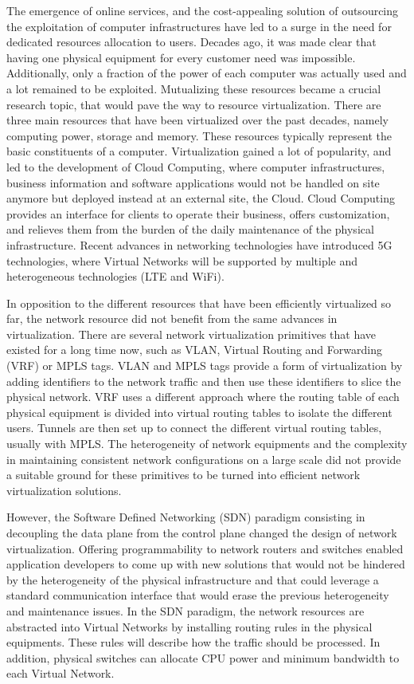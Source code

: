 \label{sec:thesis_introduction}
The emergence of online services, and the cost-appealing solution of outsourcing the exploitation of computer infrastructures have led to a surge in the need for dedicated resources allocation to users. Decades ago, it was made clear that having one physical equipment for every customer need was impossible. Additionally, only a fraction of the power of each computer was actually used and a lot remained to be exploited.
Mutualizing these resources became a crucial research topic, that would pave the way to resource virtualization. 
There are three main resources that have been virtualized over the past decades, namely computing power, storage and memory.
These resources typically represent the basic constituents of a computer.
Virtualization gained a lot of popularity, and led to the development of Cloud Computing, where computer infrastructures, business information and software applications would not be handled on site anymore but deployed instead at an external site, \ie the Cloud.
Cloud Computing provides an interface for clients to operate their business, offers customization, and relieves them from the burden of the daily maintenance of the physical infrastructure. Recent advances in networking technologies have introduced 5G technologies, where Virtual Networks will be supported by multiple and heterogeneous technologies (\eg LTE and WiFi).

In opposition to the different resources that have been efficiently virtualized so far, the network resource did not benefit from the same advances in virtualization.
There are several network virtualization primitives that have existed for a long time now, such as VLAN, Virtual Routing and Forwarding (VRF) or MPLS tags. VLAN and MPLS tags provide a form of virtualization by adding identifiers to the network traffic and then use these identifiers to slice the physical network. VRF uses a different approach where the routing table of each physical equipment is divided into virtual routing tables to isolate the different users. Tunnels are then set up to connect the different virtual routing tables, usually with MPLS.
The heterogeneity of network equipments and the complexity in maintaining consistent network configurations on a large scale did not provide a suitable ground for these primitives to be turned into efficient network virtualization solutions.

However, the Software Defined Networking (SDN) paradigm consisting in decoupling the data plane from the control plane changed the design of network virtualization. Offering programmability to network routers and switches enabled application developers to come up with new solutions that would not be hindered by the heterogeneity of the physical infrastructure and that could leverage a standard communication interface that would erase the previous heterogeneity and maintenance issues.
In the SDN paradigm, the network resources are abstracted into Virtual Networks by installing routing rules in the physical equipments. These rules will describe how the traffic should be processed. In addition, physical switches can allocate CPU power and minimum bandwidth to each Virtual Network.

